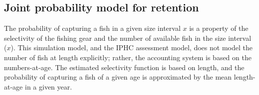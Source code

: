 \subsection{Joint probability model for retention} %
\label{sub:joint_probability_model_for_retention}
The probability of capturing a fish in a given size interval $x$ is a property of the selectivity of the fishing gear and the number of available fish in the size interval ($x$).  This simulation model, and the IPHC assessment model, does not model the number of fish at length explicitly; rather, the accounting system is based on the numbers-at-age.  The estimated selectivity function is based on length, and the probability of capturing a fish of a given age is approximated by the mean length-at-age in a given year.  




